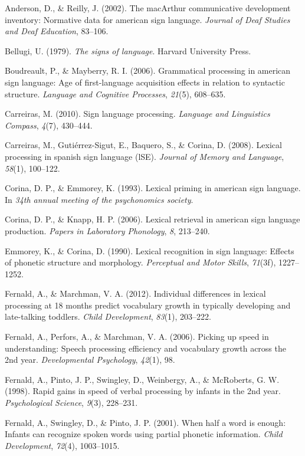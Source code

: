 \documentclass[12pt,]{article}
\begin{document}
Anderson, D., \& Reilly, J. (2002). The macArthur communicative
development inventory: Normative data for american sign language.
\emph{Journal of Deaf Studies and Deaf Education}, 83--106.

Bellugi, U. (1979). \emph{The signs of language}. Harvard University
Press.

Boudreault, P., \& Mayberry, R. I. (2006). Grammatical processing in
american sign language: Age of first-language acquisition effects in
relation to syntactic structure. \emph{Language and Cognitive
Processes}, \emph{21}(5), 608--635.

Carreiras, M. (2010). Sign language processing. \emph{Language and
Linguistics Compass}, \emph{4}(7), 430--444.

Carreiras, M., Guti{é}rrez-Sigut, E., Baquero, S., \& Corina, D. (2008).
Lexical processing in spanish sign language (lSE). \emph{Journal of
Memory and Language}, \emph{58}(1), 100--122.

Corina, D. P., \& Emmorey, K. (1993). Lexical priming in american sign
language. In \emph{34th annual meeting of the psychonomics society}.

Corina, D. P., \& Knapp, H. P. (2006). Lexical retrieval in american
sign language production. \emph{Papers in Laboratory Phonology},
\emph{8}, 213--240.

Emmorey, K., \& Corina, D. (1990). Lexical recognition in sign language:
Effects of phonetic structure and morphology. \emph{Perceptual and Motor
Skills}, \emph{71}(3f), 1227--1252.

Fernald, A., \& Marchman, V. A. (2012). Individual differences in
lexical processing at 18 months predict vocabulary growth in typically
developing and late-talking toddlers. \emph{Child Development},
\emph{83}(1), 203--222.

Fernald, A., Perfors, A., \& Marchman, V. A. (2006). Picking up speed in
understanding: Speech processing efficiency and vocabulary growth across
the 2nd year. \emph{Developmental Psychology}, \emph{42}(1), 98.

Fernald, A., Pinto, J. P., Swingley, D., Weinbergy, A., \& McRoberts, G.
W. (1998). Rapid gains in speed of verbal processing by infants in the
2nd year. \emph{Psychological Science}, \emph{9}(3), 228--231.

Fernald, A., Swingley, D., \& Pinto, J. P. (2001). When half a word is
enough: Infants can recognize spoken words using partial phonetic
information. \emph{Child Development}, \emph{72}(4), 1003--1015.
\end{document}

